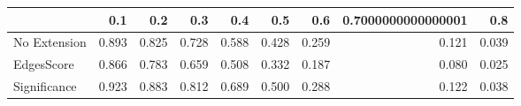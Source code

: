 \begin{tabular}{lrrrrrrrr}
\toprule
{} &   0.1 &   0.2 &   0.3 &   0.4 &   0.5 &   0.6 & 0.7000000000000001 &   0.8 \\
\midrule
No Extension & 0.893 & 0.825 & 0.728 & 0.588 & 0.428 & 0.259 &              0.121 & 0.039 \\
EdgesScore   & 0.866 & 0.783 & 0.659 & 0.508 & 0.332 & 0.187 &              0.080 & 0.025 \\
Significance & 0.923 & 0.883 & 0.812 & 0.689 & 0.500 & 0.288 &              0.122 & 0.038 \\
\bottomrule
\end{tabular}
